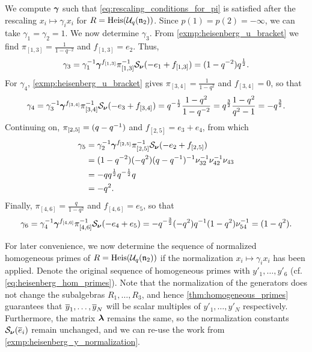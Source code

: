 \begin{example}\label{exmp:heisenberg_rescaling}

	We compute $\boldsymbol{\gamma}$ such that \cref{eq:rescaling_conditions_for_pi} is satisfied after
	the rescaling $x_i \mapsto \gamma_i x_i$ for $R = \operatorname{Heis}(\mathcal{U}_q(\mathfrak{n}_2))$.
	Since $p(1) = p(2) = -\infty$, we can take $\gamma_1 = \gamma_2 = 1$. We now determine
	$\gamma_3$. From \cref{exmp:heisenberg_u_bracket} we find $\pi_{[1, 3]} =
		\frac{1}{1-q^{-2}}$ and $f_{[1, 3]} = e_2$. Thus,
	\begin{equation*}
		\gamma_3 = \gamma_1^{-1} \boldsymbol{\gamma}^{f_{[1,3]}}\pi_{[1,3]}^{-1} \mathcal{S}_{\boldsymbol{\nu}}(-e_1 + f_{[1,3]}) = (1-q^{-2})q^{\frac{1}{2}}.
	\end{equation*}
	For $\gamma_4$, \cref{exmp:heisenberg_u_bracket} gives $\pi_{[3,4]} = \frac{1}{1-q^2}$
	and $f_{[3,4]} = 0$, so that
	\begin{equation*}
		\gamma_4 = \gamma_3^{-1} \boldsymbol{\gamma}^{f_{[3,4]}}\pi_{[3,4]}^{-1} \mathcal{S}_{\boldsymbol{\nu}}(-e_3 + f_{[3,4]}) = q^{-\frac{1}{2}}\frac{1-q^2}{1-q^{-2}} = q^{\frac{3}{2}} \frac{1-q^2}{q^2 - 1} = -q^{\frac{3}{2}}.
	\end{equation*}
	Continuing on, $\pi_{[2,5]} = (q - q^{-1})$ and $f_{[2,5]} = e_3 + e_4$, from which
	\begin{align*}
		\gamma_5
		 & = \gamma_2^{-1} \boldsymbol{\gamma}^{f_{[2,5]}}\pi_{[2,5]}^{-1} \mathcal{S}_{\boldsymbol{\nu}}(-e_2 + f_{[2,5]}) \\
		 & = (1-q^{-2})(-q^2)(q-q^{-1})^{-1} \nu_{32}^{-1}\nu_{42}^{-1}\nu_{43}             \\
		 & = -q q^{\frac{1}{2}} q^{-\frac{1}{2}}q                                       \\
		 & = -q^2.
	\end{align*}
	Finally, $\pi_{[4,6]} = \frac{q}{1-q^2}$ and $f_{[4,6]} = e_5$, so that
	\begin{equation*}
		\gamma_6
		= \gamma_4^{-1} \boldsymbol{\gamma}^{f_{[4,6]}}\pi_{[4,6]}^{-1} \mathcal{S}_{\boldsymbol{\nu}}(-e_4 + e_5)
		= -q^{-\frac{3}{2}} (-q^2) q^{-1}(1-q^2)\nu_{54}^{-1}
		= (1-q^2).
	\end{equation*}

	For later convenience, we now determine the sequence of normalized homogeneous primes
	of $R = \operatorname{Heis}(\mathcal{U}_q(\mathfrak{n}_2))$ if the normalization $x_i \mapsto \gamma_i x_i$ has been applied.
	Denote the original sequence of homogeneous primes with $y'_1, \dots, y'_6$ (cf.
	\cref{eq:heisenberg_hom_primes}). Note that the normalization of the generators does
	not change the subalgebras $R_1, \dots, R_3$, and hence \cref{thm:homogeneous_primes}
	guarantees that $\overline{y}_1, \dots, \overline{y}_N$ will be scalar multiples of $y'_1, \dots, y'_N$
	respectively. Furthermore, the matrix $\boldsymbol{\lambda}$ remains the same, so the normalization
	constants $\mathcal{S}_{\boldsymbol{\nu}}(\overline{e}_i)$ remain unchanged, and we can re-use the work from
	\cref{exmp:heisenberg_y_normalization}.


\end{example}
